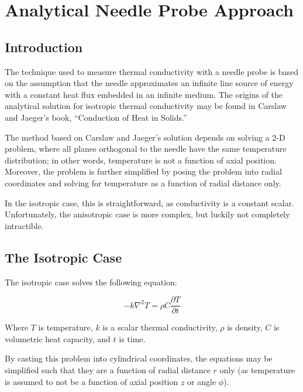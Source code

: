 \chapter{Analytical Needle Probe Approach}
\label{sec:analytical-np}
\bigskip

\section{Introduction}
\label{sec:analytical-np:intro}

The technique used to measure thermal conductivity with a needle probe is based
on the assumption that the needle approximates an infinite line source of energy
with a constant heat flux embedded in an infinite medium. The origins of the
analytical solution for isotropic thermal conductivity may be found in Carslaw
and Jaeger's book, ``Conduction of Heat in Solids.''

The method based on Carslaw and Jaeger's solution depends on solving a 2-D
problem, where all planes orthogonal to the needle have the same temperature
distribution; in other words, temperature is not a function of axial position.
Moreover, the problem is further simplified by posing the problem into radial
coordinates and solving for temperature as a function of radial distance only.

In the isotropic case, this is straightforward, as conductivity is a constant
scalar. Unfortunately, the anisotropic case is more complex, but luckily not
completely intractible.

\section{The Isotropic Case}
\label{sec:analytical-np:isotropic}

The isotropic case solves the following equation:

\begin{equation*}
-k\nabla^2 T = \rho C\frac{\partial T}{\partial t}
\end{equation*}

Where \(T\) is temperature, \(k\) is a scalar thermal conductivity, \(\rho\) is
density, \(C\) is volumetric heat capacity, and \(t\) is time.


By casting this problem into cylindrical coordinates, the equations may be
simplified such that they are a function of radial distance \(r\) only (as
temperature is assumed to not be a function of axial position \(z\) or angle
\(\phi\)).

